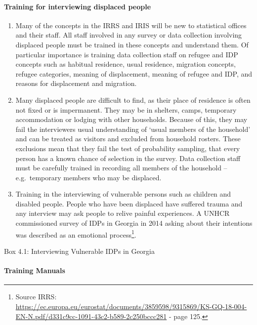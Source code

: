 \documentclass[
]{article}
\begin{document}
\hypertarget{training-for-interviewing-displaced-people}{%
\paragraph{Training for interviewing displaced people}\label{training-for-interviewing-displaced-people}}

\begin{enumerate}
\def\labelenumi{\arabic{enumi}.}
\setcounter{enumi}{338}
\item
  Many of the concepts in the IRRS and IRIS will be new to
  statistical offices and their staff. All staff involved in any
  survey or data collection involving displaced people must be trained
  in these concepts and understand them. Of particular importance is
  training data collection staff on refugee and IDP concepts such as
  habitual residence, usual residence, migration concepts, refugee
  categories, meaning of displacement, meaning of refugee and IDP, and
  reasons for displacement and migration.
\item
  Many displaced people are difficult to find, as their place of
  residence is often not fixed or is impermanent. They may be in
  shelters, camps, temporary accommodation or lodging with other
  households. Because of this, they may fail the interviewers usual
  understanding of `usual members of the household' and can be treated
  as visitors and excluded from household rosters. These exclusions
  mean that they fail the test of probability sampling, that every
  person has a known chance of selection in the survey. Data
  collection staff must be carefully trained in recording all members
  of the household -- e.g.~temporary members who may be displaced.
\item
  Training in the interviewing of vulnerable persons such as children
  and disabled people. People who have been displaced have suffered
  trauma and any interview may ask people to relive painful
  experiences. A UNHCR commissioned survey of IDPs in Georgia in 2014
  asking about their intentions was described as an emotional
  process\footnote{Source IRRS:
    \url{https://ec.europa.eu/eurostat/documents/3859598/9315869/KS-GQ-18-004-EN-N.pdf/d331c9cc-1091-43c2-b589-2c250bccc281}
    - page 125.}.
\end{enumerate}

Box 4.1: Interviewing Vulnerable IDPs in Georgia

\hypertarget{training-manuals}{%
\paragraph{Training Manuals}\label{training-manuals}}
\end{document}
